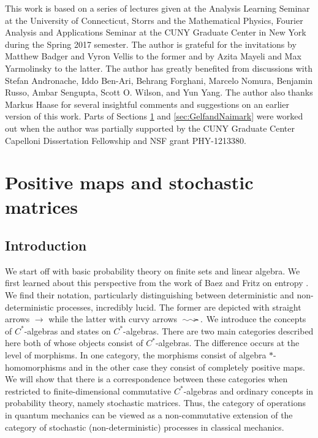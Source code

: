 \documentclass[12pt]{article}
\makeatletter
\theoremstyle{theorem}
\theoremstyle{definition}
\numberwithin{equation}{section}
\newcommand{\<}{\langle}
\renewcommand{\>}{\rangle}
\newcommand{\stoch}{\;\xy0;/r.25pc/:\ar@{~>}(3,0);(-3,0);\endxy\;}
\makeatother
\begin{document}
This work is based on a series of lectures given
at the Analysis Learning Seminar at the University of
Connecticut, Storrs and
the Mathematical Physics, Fourier Analysis and Applications Seminar
at the CUNY Graduate Center in New York
during the Spring 2017 semester. 
The author is grateful for the invitations
by Matthew Badger and Vyron Vellis to the former and 
by Azita Mayeli and Max Yarmolinsky to the latter. 
The author has greatly benefited from discussions with 
Stefan Andronache,
Iddo Ben-Ari,
Behrang Forghani, 
Marcelo Nomura,
Benjamin Russo,
Ambar Sengupta, 
Scott O. Wilson, 
and Yun Yang.
The author also thanks Markus Haase for several insightful comments
and suggestions on an earlier version of this work.
Parts of Sections \ref{sec:stochasticmatrices} and \ref{sec:GelfandNaimark}
were worked out when the author was partially supported by 
the CUNY Graduate Center Capelloni
Dissertation Fellowship and NSF grant PHY-1213380.

\section{Positive maps and stochastic matrices}
\label{sec:stochasticmatrices}

\subsection{Introduction}

We start off with basic probability theory on finite sets
and linear algebra. We first learned about this perspective
from the work of Baez and Fritz on entropy \cite{BaFr14}.
We find their notation, particularly distinguishing between
deterministic and non-deterministic processes, incredibly lucid. 
The former are depicted with straight arrows $\longrightarrow$ 
while the latter with curvy arrows $\stoch.$ 
We introduce the concepts of $C^*$-algebras
and states on $C^*$-algebras. There are two main categories described
here both of whose objects consist of $C^*$-algebras.
The difference occurs at the level of morphisms. 
In one category, the morphisms consist of algebra $*$-homomorphisms
and in the other case they consist of completely positive maps. 
We will show that there is a correspondence 
between these categories when restricted to finite-dimensional 
commutative $C^*$-algebras and ordinary concepts in probability theory, 
namely stochastic matrices. 
Thus, the category of operations in quantum mechanics can be viewed
as a non-commutative extension of the category of stochastic
(non-deterministic) processes in classical mechanics. 
\end{document}
